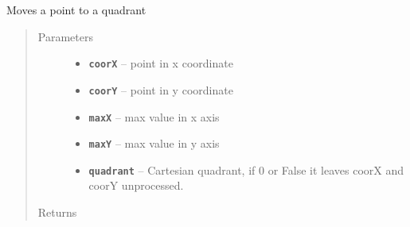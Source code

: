 \documentclass[letterpaper,10pt,english]{sphinxmanual}
\begin{document}

\begin{fulllineitems}
\label{RRtoolbox.lib.arrayops:RRtoolbox.lib.arrayops.basic.quadrant}
Moves a point to a quadrant
\begin{quote}\begin{description}
\item[{Parameters}] \leavevmode\begin{itemize}
\item {} 
\textbf{\texttt{coorX}} -- point in x coordinate

\item {} 
\textbf{\texttt{coorY}} -- point in y coordinate

\item {} 
\textbf{\texttt{maxX}} -- max value in x axis

\item {} 
\textbf{\texttt{maxY}} -- max value in y axis

\item {} 
\textbf{\texttt{quadrant}} -- Cartesian quadrant, if 0 or False it leaves coorX and coorY unprocessed.

\end{itemize}

\item[{Returns}] \leavevmode


\end{description}\end{quote}

\end{fulllineitems}

\end{document}
